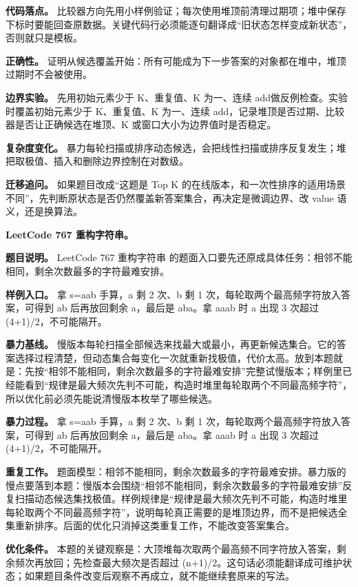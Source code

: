 \textbf{代码落点。} 比较器方向先用小样例验证；每次使用堆顶前清理过期项；堆中保存下标时要能回查原数据。关键代码行必须能逐句翻译成“旧状态怎样变成新状态”，否则就只是模板。

\textbf{正确性。} 证明从候选覆盖开始：所有可能成为下一步答案的对象都在堆中，堆顶过期时不会被使用。

\textbf{边界实验。} 先用初始元素少于 K、重复值、K 为一、连续 add做反例检查。实验时覆盖初始元素少于 K、重复值、K 为一、连续 add，记录堆顶是否过期、比较器是否让正确候选在堆顶、K 或窗口大小为边界值时是否稳定。

\textbf{复杂度变化。} 暴力每轮扫描或排序动态候选，会把线性扫描或排序反复发生；堆把取极值、插入和删除边界控制在对数级。

\textbf{迁移追问。} 如果题目改成“这题是 Top K 的在线版本，和一次性排序的适用场景不同”，先判断原状态是否仍然覆盖新答案集合，再决定是微调边界、改 value 语义，还是换算法。

\noindent\textbf{LeetCode 767 重构字符串。}

\textbf{题目说明。} LeetCode 767 重构字符串 的题面入口要先还原成具体任务：相邻不能相同，剩余次数最多的字符最难安排。

\textbf{样例入口。} 拿 s=aab 手算，a 剩 2 次、b 剩 1 次，每轮取两个最高频字符放入答案，可得到 ab 后再放回剩余 a，最后是 aba。拿 aaab 时 a 出现 3 次超过 (4+1)/2，不可能隔开。

\textbf{暴力基线。} 慢版本每轮扫描全部候选来找最大或最小，再更新候选集合。它的答案选择过程清楚，但动态集合每变化一次就重新找极值，代价太高。放到本题就是：先按“相邻不能相同，剩余次数最多的字符最难安排”完整试慢版本；样例里已经能看到“规律是最大频次先判不可能，构造时堆里每轮取两个不同最高频字符”，所以优化前必须先能说清慢版本枚举了哪些候选。

\textbf{暴力过程。} 拿 s=aab 手算，a 剩 2 次、b 剩 1 次，每轮取两个最高频字符放入答案，可得到 ab 后再放回剩余 a，最后是 aba。拿 aaab 时 a 出现 3 次超过 (4+1)/2，不可能隔开。

\textbf{重复工作。} 题面模型：相邻不能相同，剩余次数最多的字符最难安排。暴力版的慢点要落到本题：慢版本会围绕“相邻不能相同，剩余次数最多的字符最难安排”反复扫描动态候选集找极值。样例规律是“规律是最大频次先判不可能，构造时堆里每轮取两个不同最高频字符”，说明每轮真正需要的是堆顶边界，而不是把候选全集重新排序。后面的优化只消掉这类重复工作，不能改变答案集合。

\textbf{优化条件。} 本题的关键观察是：大顶堆每次取两个最高频不同字符放入答案，剩余频次再放回；先检查最大频次是否超过 (n+1)/2。这句话必须能翻译成可维护状态；如果题目条件改变后观察不再成立，就不能继续套原来的写法。

